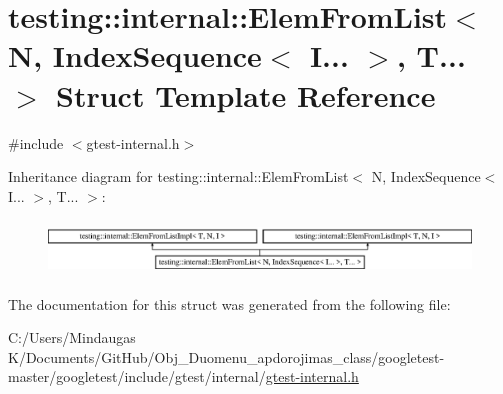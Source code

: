 \hypertarget{structtesting_1_1internal_1_1_elem_from_list_3_01_n_00_01_index_sequence_3_01_i_8_8_8_01_4_00_01_t_8_8_8_01_4}{}\section{testing\+::internal\+::Elem\+From\+List$<$ N, Index\+Sequence$<$ I... $>$, T... $>$ Struct Template Reference}
\label{structtesting_1_1internal_1_1_elem_from_list_3_01_n_00_01_index_sequence_3_01_i_8_8_8_01_4_00_01_t_8_8_8_01_4}


{\ttfamily \#include $<$gtest-\/internal.\+h$>$}

Inheritance diagram for testing\+::internal\+::Elem\+From\+List$<$ N, Index\+Sequence$<$ I... $>$, T... $>$\+:\begin{figure}[H]
\begin{center}
\leavevmode
\includegraphics[height=1.473684cm]{df/d32/structtesting_1_1internal_1_1_elem_from_list_3_01_n_00_01_index_sequence_3_01_i_8_8_8_01_4_00_01_t_8_8_8_01_4}
\end{center}
\end{figure}


The documentation for this struct was generated from the following file\+:\begin{DoxyCompactItemize}
\item 
C\+:/\+Users/\+Mindaugas K/\+Documents/\+Git\+Hub/\+Obj\+\_\+\+Duomenu\+\_\+apdorojimas\+\_\+class/googletest-\/master/googletest/include/gtest/internal/\mbox{\hyperlink{googletest-master_2googletest_2include_2gtest_2internal_2gtest-internal_8h}{gtest-\/internal.\+h}}\end{DoxyCompactItemize}
